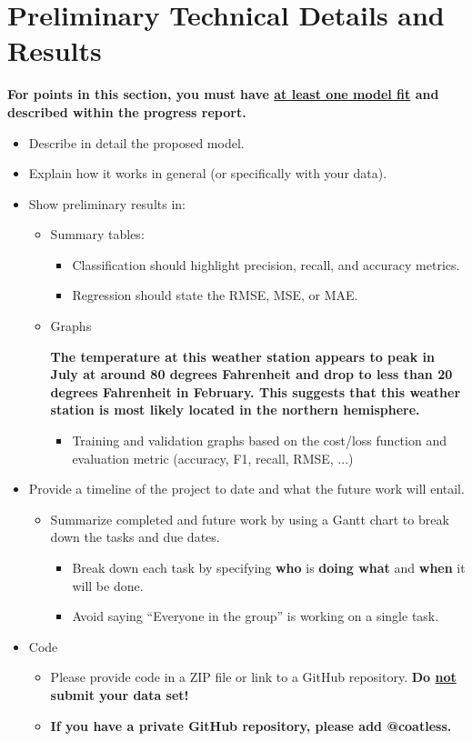 \documentclass[conference]{IEEEtran}
\begin{document}
\section{Preliminary Technical Details and Results}

\textbf{For points in this section, you must have \underline{at least one model fit} and described within the progress report.}

\begin{itemize}
  \item Describe in detail the proposed model.
  \item Explain how it works in general (or specifically with your data).
  \item Show preliminary results in:
  \begin{itemize}
    \item Summary tables:
    \begin{itemize}
      \item Classification should highlight precision, recall, and accuracy metrics.
      \item Regression should state the RMSE, MSE, or MAE.
    \end{itemize}
    \item Graphs

    \textbf{The temperature at this weather station appears to peak in July at around 80 degrees Fahrenheit and drop to less than 20 degrees Fahrenheit in February. This suggests that this weather station is most likely located in the northern hemisphere.} \\

    \begin{itemize}
      \item Training and validation graphs based on the cost/loss function and evaluation metric (accuracy, F1, recall, RMSE, ...)
    \end{itemize}
  \end{itemize}
  \item Provide a timeline of the project to date and what the future work will entail.
  \begin{itemize}
    \item Summarize completed and future work by using a Gantt chart to break down the tasks and due dates.
    \begin{itemize}
      \item Break down each task by specifying \textbf{who} is \textbf{doing what} and \textbf{when} it will be done.
      \item Avoid saying ``Everyone in the group'' is working on a single task.
    \end{itemize}
  \end{itemize}
  \item Code
  \begin{itemize}
    \item Please provide code in a ZIP file or link to a GitHub repository. \textbf{Do \underline{not} submit your data set!}
    \item \textbf{If you have a private GitHub repository, please add @coatless.}
  \end{itemize}
\end{itemize}
\end{document}
